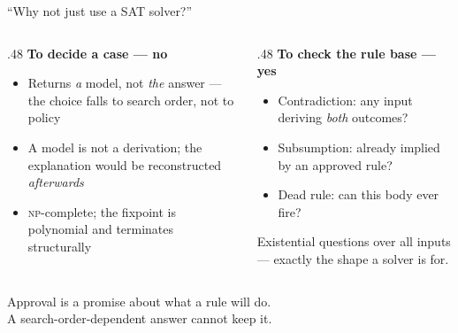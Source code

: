 \documentclass[aspectratio=169,11pt]{beamer}
\begin{document}
\begin{frame}{``Why not just use a SAT solver?''}
  \vspace{.6em}
  \begin{columns}[T]
    \begin{column}{.48\textwidth}
      \textbf{\color{pinedark}To decide a case --- no}
      \begin{itemize}
        \setlength\itemsep{.55em}
        \item Returns \emph{a} model, not \emph{the} answer --- the choice
          falls to search order, not to policy
        \item A model is not a derivation; the explanation would be
          reconstructed \emph{afterwards}
        \item \textsc{np}-complete; the fixpoint is polynomial and terminates
          structurally
      \end{itemize}
    \end{column}
    \begin{column}{.48\textwidth}
      \textbf{\color{amber}To check the rule base --- yes}
      \begin{itemize}
        \setlength\itemsep{.55em}
        \item Contradiction: any input deriving \emph{both} outcomes?
        \item Subsumption: already implied by an approved rule?
        \item Dead rule: can this body ever fire?
      \end{itemize}
      \vspace{.4em}
      {\small\color{muted} Existential questions over all inputs --- exactly
      the shape a solver is for.}
    \end{column}
  \end{columns}
  \vspace{1.2em}
  \pause
  \begin{center}\color{muted}
    Approval is a promise about what a rule will do.\\
    A search-order-dependent answer cannot keep it.
  \end{center}
\end{frame}
\end{document}
